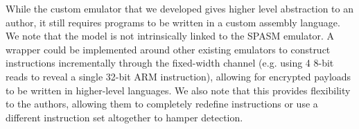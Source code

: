 
While the custom emulator that we developed gives higher level abstraction to
an author, it still requires programs to be written in a custom assembly language. 
We note that the \speculake model is not intrinsically linked to the SPASM emulator. 
A wrapper could be implemented around other existing emulators to construct
instructions incrementally through the fixed-width channel (e.g. using 4 8-bit
reads to reveal a single 32-bit ARM instruction), allowing for encrypted
payloads to be written in higher-level languages. We also note that this
provides flexibility to the authors, allowing them to completely redefine
instructions or use a different instruction set altogether to hamper detection.
